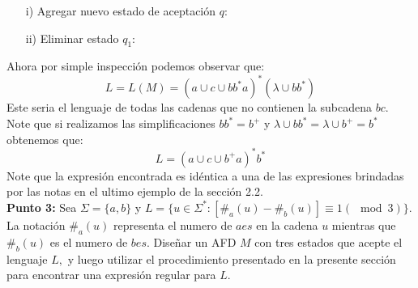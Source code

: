 \begin{itemize}
    \item[i)] Agregar nuevo estado de aceptación $q$: 
    \begin{basedtikz}
    \centering
\end{basedtikz}
    \item[ii)] Eliminar estado $q_1$:
    \begin{basedtikz}
    \centering
\end{basedtikz}
\end{itemize}
Ahora por simple inspección podemos observar que:
$$L=L(M)=(a\cup c\cup bb^*a)^*(\lambda\cup bb^*)$$
Este seria el lenguaje de todas las cadenas que no contienen la subcadena $bc$. Note que si realizamos las simplificaciones $bb^*=b^+$ y $\lambda\cup bb^*=\lambda\cup b^+=b^*$ obtenemos que: 
$$L=(a\cup c\cup b^+a)^*b^*$$
Note que la expresión encontrada es idéntica a una de las expresiones brindadas por las notas en el ultimo ejemplo de la sección 2.2.\\ 

\textbf{Punto 3: } Sea $\Sigma=\{a,b\}$ y $L=\{u\in\Sigma^*:[\#_a(u)-\#_b(u)]\equiv 1(\mod3) \}.$ La notación $\#_a(u)$ representa el numero de $aes$ en la cadena $u$ mientras que $\#_b(u)$ es el numero de $bes.$ Diseñar un AFD $M$ con tres estados que acepte el lenguaje $L,$ y luego utilizar el procedimiento presentado en la presente sección para encontrar una expresión regular para $L.$\\ 

